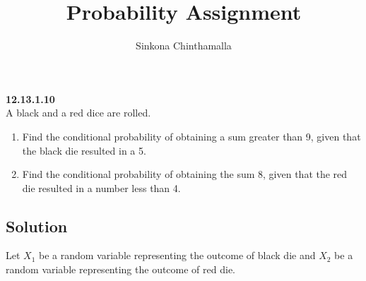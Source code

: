 \documentclass[10pt,twocolumn]{article}
\title{\textbf{Probability Assignment}}
\author{Sinkona Chinthamalla}
\begin{document}
\maketitle

\textbf {12.13.1.10} \\
A black and a red dice are rolled.
\begin{enumerate}
\item Find the conditional probability of obtaining a sum greater than 9, given that the black die resulted in a 5.
\item Find the conditional probability of obtaining the sum 8, given that the red die resulted in a number less than 4.
\end{enumerate}

\subsection*{Solution}
Let $X_1$ be a random variable representing the outcome of black die and $X_2$ be a random variable representing the outcome of red die.
\end{document}
